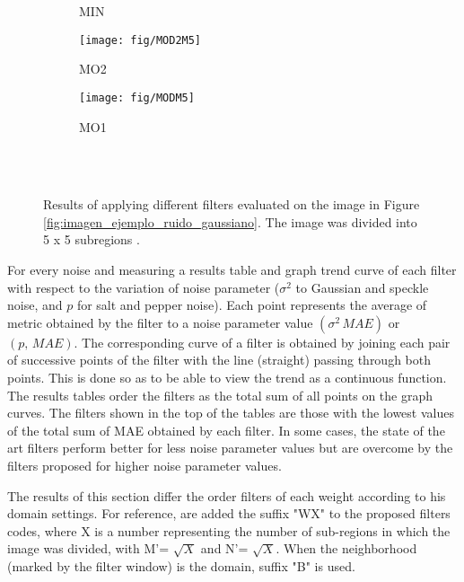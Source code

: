 \begin{figure*}
{\begin{subfigure}[b]{0.25\textwidth}
			\caption{MIN}
			\label{fig:min}
		\end{subfigure}
		\begin{subfigure}[b]{0.25\textwidth}
			\centering
			\texttt{[image: fig/MOD2M5]}
			\caption{MO2}
			\label{fig:mo2}
		\end{subfigure}
		\begin{subfigure}[b]{0.25\textwidth}
			\centering
			\texttt{[image: fig/MODM5]}
			\caption{MO1}
			\label{fig:mo1}
		\end{subfigure}
	}\\
	\\
	\caption{Results of applying different filters evaluated on the image in Figure \ref{fig:imagen_ejemplo_ruido_gaussiano}. The image was divided into 5 x 5 subregions .}	
	\label{fig:imagenes_resultado}
\end{figure*}

For every noise and measuring a results table and graph trend curve of each filter with respect to the variation of noise parameter ($\sigma^2$ to Gaussian and speckle noise, and $p$ for salt and pepper noise). Each point represents the average of metric obtained by the filter to a noise parameter value $(\sigma^2\, MAE)$ or $(p,\,MAE)$. The corresponding curve of a filter is obtained by joining each pair of successive points of the filter with the line  (straight) passing through both points. This is done so as to be able to view the trend as a continuous function. The results tables order the filters as the total sum of all points on the graph curves. The filters shown in the top of the tables are those with the lowest values of the total sum of MAE obtained by each filter. In some cases, the state of the art filters perform better for less noise parameter values but are overcome by the filters proposed for higher noise parameter values. 

 The results of this section differ the order filters of each weight according to his domain settings. For reference, are added the suffix "WX" to the proposed filters codes, where X is a number representing the number of sub-regions in which the image was divided, with M'= $\sqrt{X}$ and N'= $\sqrt{X}$. When the neighborhood (marked by the filter window) is the domain, suffix "B" is used.

